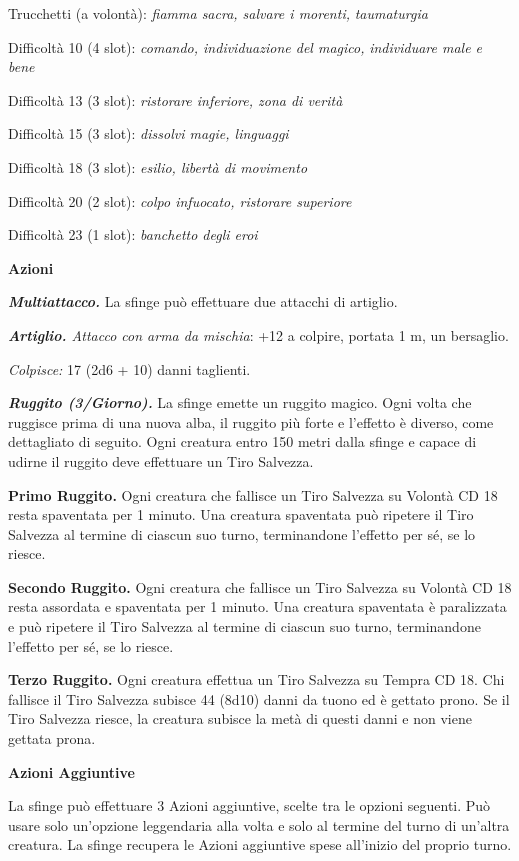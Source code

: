 \begin{multicols}{2}
Trucchetti (a volontà): \emph{fiamma sacra, salvare i morenti,}
\emph{taumaturgia}

Difficoltà 10 (4 slot): \emph{comando, individuazione del magico,}
\emph{individuare male e bene}

Difficoltà 13 (3 slot): \emph{ristorare inferiore, zona di verità}

Difficoltà 15 (3 slot): \emph{dissolvi magie, linguaggi}

Difficoltà 18 (3 slot): \emph{esilio, libertà di movimento}

Difficoltà 20 (2 slot): \emph{colpo infuocato, ristorare superiore}

Difficoltà 23 (1 slot): \emph{banchetto degli eroi}

\textbf{Azioni}

\emph{\textbf{Multiattacco.}} La sfinge può effettuare due attacchi di
artiglio.

\emph{\textbf{Artiglio.} Attacco con arma da mischia}: +12 a colpire,
portata 1 m, un bersaglio.

\emph{Colpisce:} 17 (2d6 + 10) danni taglienti.

\emph{\textbf{Ruggito (3/Giorno).}} La sfinge emette un ruggito magico. Ogni volta che ruggisce prima di una nuova alba, il ruggito più forte e l'effetto è diverso, come dettagliato di seguito. Ogni creatura entro 150 metri dalla sfinge e capace di udirne il ruggito deve effettuare un Tiro Salvezza.

\textbf{Primo Ruggito.} Ogni creatura che fallisce un Tiro Salvezza su Volontà CD 18 resta spaventata per 1 minuto. Una creatura spaventata può ripetere il Tiro Salvezza al termine di ciascun suo turno, terminandone l'effetto per sé, se lo riesce.

\textbf{Secondo Ruggito.} Ogni creatura che fallisce un Tiro Salvezza su Volontà CD 18 resta assordata e spaventata per 1 minuto. Una creatura spaventata è paralizzata e può ripetere il Tiro Salvezza al termine di ciascun suo turno, terminandone l'effetto per sé, se lo riesce.

\textbf{Terzo Ruggito.} Ogni creatura effettua un Tiro Salvezza su Tempra CD 18. Chi fallisce il Tiro Salvezza subisce 44 (8d10) danni da tuono ed è gettato prono. Se il Tiro Salvezza riesce, la creatura subisce la metà di questi danni e non viene gettata prona. 

\textbf{Azioni Aggiuntive}

La sfinge può effettuare 3 Azioni aggiuntive, scelte tra le opzioni seguenti. Può usare solo un'opzione leggendaria alla volta e solo al termine del turno di un'altra creatura. La sfinge recupera le Azioni aggiuntive spese all'inizio del proprio turno.


\end{multicols}
